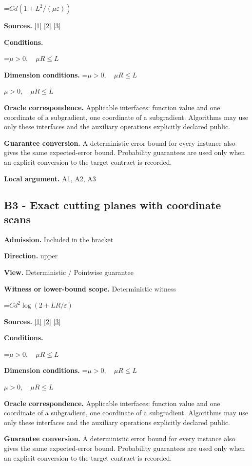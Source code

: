 \documentclass[10pt,a4paper]{article}
\newcommand{\AtlasMath}[1]{\par\begingroup\centering\setbox0=\hbox{$\displaystyle #1$}\ifdim\wd0>1.4\linewidth\typeout{ATLAS WIDE FORMULA: \the\wd0}\fi\ifdim\wd0>\linewidth\resizebox{\linewidth}{!}{\box0}\else\box0\fi\par\endgroup}
\newcommand{\AtlasInlineMath}[1]{\begingroup\setbox0=\hbox{$#1$}\ifdim\wd0>.4\linewidth\endgroup\AtlasMath{#1}\else\endgroup$#1$\fi}
\begin{document}
\AtlasMath{Cd(1+L^2/(\mu\varepsilon))}
\textbf{Sources.} \href{https://arxiv.org/pdf/1405.4980}{[1]} \href{https://www2.isye.gatech.edu/~nemirovs/MOR_AccuracyCertificates.pdf}{[2]} \href{https://arxiv.org/pdf/2609.20701}{[3]}

\textbf{Conditions.} 
\AtlasMath{\mu>0,\quad\mu R\le L}


\textbf{Dimension conditions.} \AtlasInlineMath{\mu>0,\quad\mu R\le L}

\textbf{Oracle correspondence.} Applicable interfaces: function value and one coordinate of a subgradient, one coordinate of a subgradient. Algorithms may use only these interfaces and the auxiliary operations explicitly declared public.

\textbf{Guarantee conversion.} A deterministic error bound for every instance also gives the same expected-error bound. Probability guarantees are used only when an explicit conversion to the target contract is recorded.

\textbf{Local argument.} A1, A2, A3

\subsection{B3 - Exact cutting planes with coordinate scans}
\textbf{Admission.} Included in the bracket

\textbf{Direction.} upper

\textbf{View.} Deterministic / Pointwise guarantee

\textbf{Witness or lower-bound scope.} Deterministic witness

\AtlasMath{Cd^2\log(2+LR/\varepsilon)}
\textbf{Sources.} \href{https://arxiv.org/pdf/1405.4980}{[1]} \href{https://www2.isye.gatech.edu/~nemirovs/MOR_AccuracyCertificates.pdf}{[2]} \href{https://arxiv.org/pdf/2609.20701}{[3]}

\textbf{Conditions.} 
\AtlasMath{\mu>0,\quad\mu R\le L}


\textbf{Dimension conditions.} \AtlasInlineMath{\mu>0,\quad\mu R\le L}

\textbf{Oracle correspondence.} Applicable interfaces: function value and one coordinate of a subgradient, one coordinate of a subgradient. Algorithms may use only these interfaces and the auxiliary operations explicitly declared public.

\textbf{Guarantee conversion.} A deterministic error bound for every instance also gives the same expected-error bound. Probability guarantees are used only when an explicit conversion to the target contract is recorded.
\end{document}
